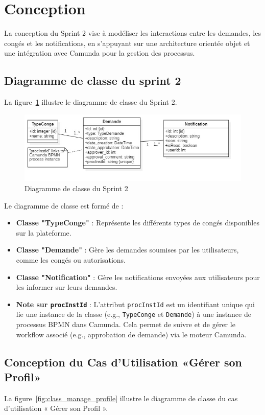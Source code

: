 \section{Conception}
La conception du Sprint 2 vise à modéliser les interactions entre les demandes, les congés et les notifications, en s’appuyant sur une architecture orientée objet et une intégration avec Camunda pour la gestion des processus.\\
\subsection{Diagramme de classe du sprint 2}
La figure~\ref{fig:class_diagram_sprint2} illustre le diagramme de classe du Sprint 2.\\
\newpage
\begin{figure}[h]
     \centering
     \includegraphics[width=15cm]{images/s2.jpg}
     \caption{Diagramme de classe du Sprint 2}
     \label{fig:class_diagram_sprint2}
\end{figure}
Le diagramme de classe est formé de :
\begin{itemize}
    \item \textbf{Classe "TypeConge"} : Représente les différents types de congés disponibles sur la plateforme.
    \item \textbf{Classe "Demande"} : Gère les demandes soumises par les utilisateurs, comme les congés ou autorisations.
    \item \textbf{Classe "Notification"} : Gère les notifications envoyées aux utilisateurs pour les informer sur leurs demandes.
    \item \textbf{Note sur \texttt{procInstId}} : L’attribut \texttt{procInstId} est un identifiant unique qui lie une instance de la classe (e.g., \texttt{TypeConge} et \texttt{Demande}) à une instance de processus BPMN dans Camunda. Cela permet de suivre et de gérer le workflow associé (e.g., approbation de demande) via le moteur Camunda.
\end{itemize}
\subsection{Conception du Cas d'Utilisation «Gérer son Profil»}
La figure~\ref{fig:class_manage_profile} illustre le diagramme de classe du cas d’utilisation « Gérer son Profil ».

